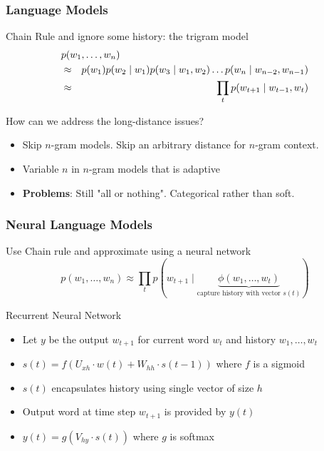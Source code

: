 \begin{frame}
\frametitle{Language Models}
\begin{block}{Chain Rule and ignore some history: the trigram model}
\begin{eqnarray*}
\lefteqn{p(w_1, \ldots, w_n) } \\
&\approx& p(w_1) p(w_2 \mid w_1) p(w_3 \mid w_1, w_2) \ldots p(w_n \mid w_{n-2}, w_{n-1}) \\
&\approx& \prod_{t} p(w_{t+1} \mid w_{t-1}, w_t)
\end{eqnarray*}
\end{block}
\pause
\begin{block}{How can we address the long-distance issues?}
\begin{itemize}
\item Skip $n$-gram models. Skip an arbitrary distance for $n$-gram context.
\item Variable $n$ in $n$-gram models that is adaptive
\item {\bf Problems}: Still "all or nothing". Categorical rather than soft.
\end{itemize}
\end{block}
\end{frame}


\begin{frame}
\frametitle{Neural Language Models}
\begin{block}{Use Chain rule and approximate using a neural network}
\[ p(w_1, \ldots, w_n) \approx \prod_{t} p(w_{t+1} \mid \underbrace{\phi(w_1, \ldots, w_t)}_{\text{capture history with vector $s(t)$}}) \]
\end{block}
\pause
\begin{block}{Recurrent Neural Network}
\begin{itemize}[<+->]
	\item Let $y$ be the output $w_{t+1}$ for current word $w_t$ and history $w_1, \ldots, w_t$
	\item $s(t) = f(U_{xh} \cdot w(t) + W_{hh} \cdot s(t-1))$ where $f$ is a sigmoid
	\item $s(t)$ encapsulates history using single vector of size $h$
	\item Output word at time step $w_{t+1}$ is provided by $y(t)$
	\item $y(t) = g(V_{hy} \cdot s(t))$ where $g$ is softmax
\end{itemize}
\end{block}
\end{frame}

